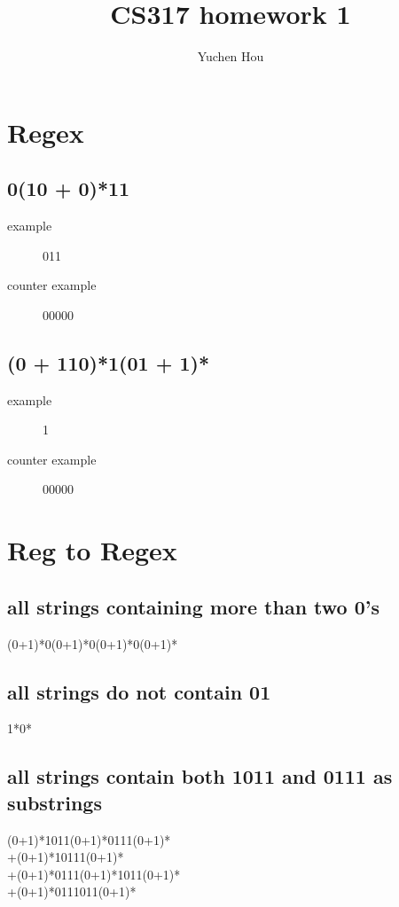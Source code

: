 \documentclass{article}
\begin{document}
\title{CS317 homework 1}
\author{Yuchen Hou}
\maketitle

\section{Regex}

\subsection{0(10 + 0)*11}
\begin{description}
\item[example] 011
\item[counter example] 00000
\end{description}

\subsection{(0 + 110)*1(01 + 1)*}
\begin{description}
\item[example] 1
\item[counter example] 00000
\end{description}

\section{Reg to Regex}

\subsection{all strings containing more than two 0’s}
(0+1)*0(0+1)*0(0+1)*0(0+1)*

\subsection{all strings do not contain 01}
1*0*

\subsection{all strings contain both 1011 and 0111 as substrings}
(0+1)*1011(0+1)*0111(0+1)*\\
+(0+1)*10111(0+1)*\\
+(0+1)*0111(0+1)*1011(0+1)*\\
+(0+1)*0111011(0+1)*
\end{document}

